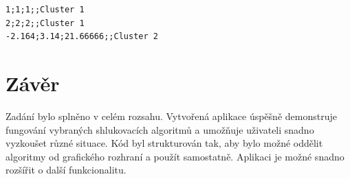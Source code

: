 \documentclass[pdftex,a4paper]{article}
\begin{document}
\begin{lstlisting}
1;1;1;;Cluster 1
2;2;2;;Cluster 1
-2.164;3.14;21.66666;;Cluster 2
\end{lstlisting}



\section{Závěr}

Zadání bylo splněno v celém rozsahu. Vytvořená aplikace úspěšně demonstruje fungování vybraných shlukovacích algoritmů a umožňuje uživateli snadno vyzkoušet různé situace. Kód byl strukturován tak, aby bylo možné oddělit algoritmy od grafického rozhraní a použít samostatně. Aplikaci je možné snadno rozšířit o další funkcionalitu.
\end{document}
